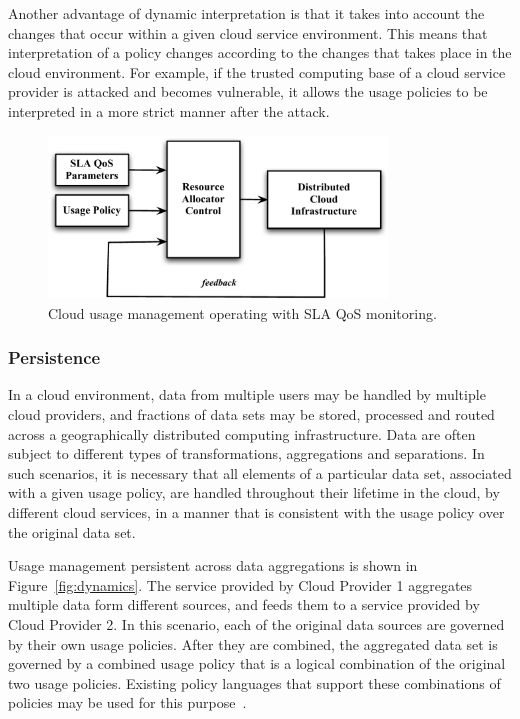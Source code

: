 \documentclass[10pt, conference, compsocconf]{IEEEtran}
\begin{document}
Another advantage of dynamic interpretation is that it takes into account the changes that occur within a given cloud service environment. This means that interpretation of a policy changes according to the changes that takes place in the cloud environment. For example, if the trusted computing base of a cloud service provider is attacked and becomes vulnerable, it allows the usage policies to be interpreted in a more strict manner after the attack. 

\begin{figure}[t]
\centering
\includegraphics[width=9cm]{sla-usage}
\caption{Cloud usage management operating with SLA QoS monitoring.}
\label{fig:sla-usage}
\end{figure}



\subsubsection {Persistence}
In a cloud environment, data from multiple users may be handled by multiple cloud providers, and fractions of data sets may be stored, processed and routed across a geographically distributed computing infrastructure. Data are often subject to different types of transformations, aggregations and separations.  In such scenarios, it is necessary that all elements of a particular data set, associated with a given usage policy, are handled throughout their lifetime in the cloud, by different cloud services, in a manner that is consistent with the usage policy over the original data set. 

Usage management persistent across data aggregations is shown in Figure~\ref{fig:dynamics}. The service provided by Cloud Provider 1 aggregates multiple data form different sources, and feeds them to a service provided by Cloud Provider 2. In this scenario, each of the original data sources are governed by their own usage policies. After they are combined, the aggregated data set is governed by a combined usage policy that is a logical combination of the original two usage policies. Existing policy languages that support these combinations of policies may be used for this purpose~\cite{JaHe:08a}.
\end{document}
